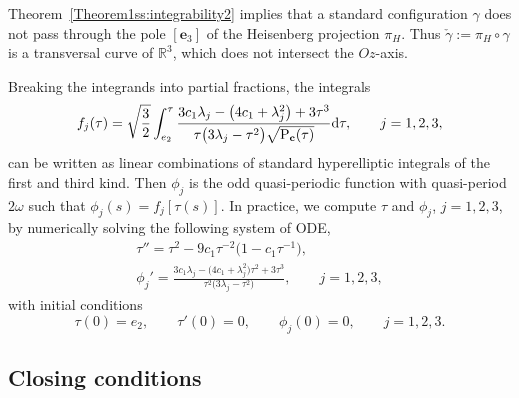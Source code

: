 \documentclass[pdftex]{sigma}
\numberwithin{equation}{section}
\def\R{\mathbb{R}}
\begin{document}
\begin{Remark}
 Theorem~\ref{Theorem1ss:integrability2} implies that a standard configuration $\gamma$
 does not pass through the pole
 $[\mathbf{e}_3]$
 of the Heisenberg projection $\pi_{H}$. Thus $\check{\gamma}:=\pi_{H}\circ \gamma$ is a transversal curve of $\R^3$,
 which does not
intersect the $Oz$-axis.
 \end{Remark}

 \begin{Remark}%
 Breaking the integrands into partial fractions, the integrals
\[
{f_j(\tau)} =
\sqrt{\frac{3}{2}}\int_{e_2}^{\tau}\frac{3c_1\lambda_j-\big(4c_1+\lambda_j^2\big)
+3\tau^3}{\tau\big(3\lambda_j-\tau^2\big)\sqrt{{\rm P}_{{\bf c}}(\tau)}}{\rm d}\tau,\qquad j=1,2,3,
\]
can be written as linear combinations of standard hyperelliptic integrals of the first and third kind.
Then $\phi_j$ is the odd quasi-periodic function with quasi-period $2\omega$ such that
{$\phi_j(s)=f_j[\tau(s)]$}.
In practice, we compute $\tau$ and $\phi_j$, $j=1,2,3$, by numerically solving the following system of ODE,
\begin{gather}
\tau''=\tau^2-9c_1\tau^{-2}\big(1-c_1\tau^{-1}\big),\nonumber\\
\phi_j'=\frac{3c_1\lambda_j-\big(4c_1+\lambda_j^2\big)\tau^2+3\tau^3}{\tau^2\big(3\lambda_j-\tau^2\big)},\qquad j =1,2,3,\label{nsol}
\end{gather}
with initial conditions
\begin{equation}\label{icon}
 \tau(0)=e_2,\qquad \tau'(0)=0,\qquad \phi_j(0)=0, \qquad j=1,2,3.\end{equation}
 \end{Remark}

\subsection{Closing conditions}%
\end{document}
